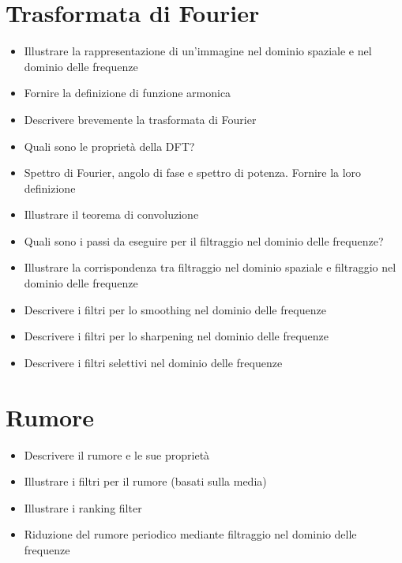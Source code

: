 \section{Trasformata di Fourier}
\begin{itemize}
	\item Illustrare la rappresentazione di un’immagine nel dominio spaziale e nel dominio delle frequenze
	\item Fornire la definizione di funzione armonica
	\item Descrivere brevemente la trasformata di Fourier
	\item Quali sono le proprietà della DFT?
	\item Spettro di Fourier, angolo di fase e spettro di potenza. Fornire la loro definizione
	\item Illustrare il teorema di convoluzione
	\item Quali sono i passi da eseguire per il filtraggio nel dominio delle frequenze?
	\item Illustrare la corrispondenza tra filtraggio nel dominio spaziale e filtraggio nel dominio delle frequenze
	\item Descrivere i filtri per lo smoothing nel dominio delle frequenze
	\item Descrivere i filtri per lo sharpening nel dominio delle frequenze
	\item Descrivere i filtri selettivi nel dominio delle frequenze
\end{itemize}

\section{Rumore}
\begin{itemize}
	\item Descrivere il rumore e le sue proprietà
	\item Illustrare i filtri per il rumore (basati sulla media)
	\item Illustrare i ranking filter
	\item Riduzione del rumore periodico mediante filtraggio nel dominio delle frequenze
\end{itemize}

